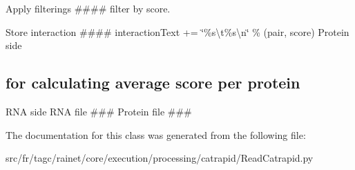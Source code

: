 Apply filterings \#\#\#\# filter by score. 

Store interaction \#\#\#\# interaction\-Text += \char`\"{}\%s\textbackslash{}t\%s\textbackslash{}n\char`\"{} \% (pair, score) Protein side \subsection*{for calculating average score per protein}

R\-N\-A side R\-N\-A file \#\#\# Protein file \#\#\# 

The documentation for this class was generated from the following file\-:\begin{DoxyCompactItemize}
\item 
src/fr/tagc/rainet/core/execution/processing/catrapid/Read\-Catrapid.\-py\end{DoxyCompactItemize}
